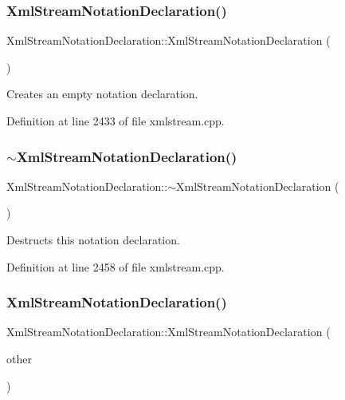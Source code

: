 \subsubsection{\texorpdfstring{Xml\+Stream\+Notation\+Declaration()}{XmlStreamNotationDeclaration()}\hspace{0.1cm}{\footnotesize\ttfamily [1/2]}}
{\footnotesize\ttfamily Xml\+Stream\+Notation\+Declaration\+::\+Xml\+Stream\+Notation\+Declaration (\begin{DoxyParamCaption}{ }\end{DoxyParamCaption})}

Creates an empty notation declaration. 

Definition at line 2433 of file xmlstream.\+cpp.

\mbox{\label{class_xml_stream_notation_declaration_a39154003f4dde259994ad84dae38a428}} 
\subsubsection{\texorpdfstring{$\sim$\+Xml\+Stream\+Notation\+Declaration()}{~XmlStreamNotationDeclaration()}}
{\footnotesize\ttfamily Xml\+Stream\+Notation\+Declaration\+::$\sim$\+Xml\+Stream\+Notation\+Declaration (\begin{DoxyParamCaption}{ }\end{DoxyParamCaption})}

Destructs this notation declaration. 

Definition at line 2458 of file xmlstream.\+cpp.

\mbox{\label{class_xml_stream_notation_declaration_a6477e182d03d9981672ac72b9a52d8bd}} 
\subsubsection{\texorpdfstring{Xml\+Stream\+Notation\+Declaration()}{XmlStreamNotationDeclaration()}\hspace{0.1cm}{\footnotesize\ttfamily [2/2]}}
{\footnotesize\ttfamily Xml\+Stream\+Notation\+Declaration\+::\+Xml\+Stream\+Notation\+Declaration (\begin{DoxyParamCaption}\item[{const \hyperlink{class_xml_stream_notation_declaration}{Xml\+Stream\+Notation\+Declaration} \&}]{other }\end{DoxyParamCaption})}

